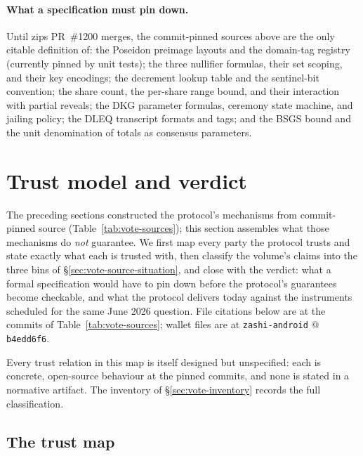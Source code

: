 \documentclass[11pt,a4paper]{article}
\theoremstyle{definition}
\begin{document}
\paragraph{What a specification must pin down.} Until zips PR~\#1200
merges, the commit-pinned sources above are the only citable definition of:
the Poseidon preimage layouts and the domain-tag registry (currently pinned
by unit tests); the three nullifier formulas, their set scoping, and their
key encodings; the decrement lookup table and the sentinel-bit convention;
the share count, the per-share range bound, and their interaction with
partial reveals; the DKG parameter formulas, ceremony state machine, and
jailing policy; the DLEQ transcript formats and tags; and the BSGS bound and
the unit denomination of totals as consensus parameters.

\section{Trust model and verdict}\label{sec:vote-trust}

The preceding sections constructed the protocol's mechanisms from
commit-pinned source (Table~\ref{tab:vote-sources}); this section assembles
what those mechanisms do \emph{not} guarantee. We first map every party the
protocol trusts and state exactly what each is trusted with, then classify
the volume's claims into the three bins of
\S\ref{sec:vote-source-situation}, and close with the verdict: what a
formal specification would have to pin down before the protocol's
guarantees become checkable, and what the protocol delivers today against
the instruments scheduled for the same June 2026 question. File citations
below are at the commits of Table~\ref{tab:vote-sources}; wallet files
are at \texttt{zashi-android} @ \texttt{b4edd6f6}.

Every trust relation in this map is itself designed but unspecified: each
is concrete, open-source behaviour at the pinned commits, and none is
stated in a normative artifact. The inventory of
\S\ref{sec:vote-inventory} records the full classification.

\subsection{The trust map}\label{sec:vote-trust-map}
\end{document}
